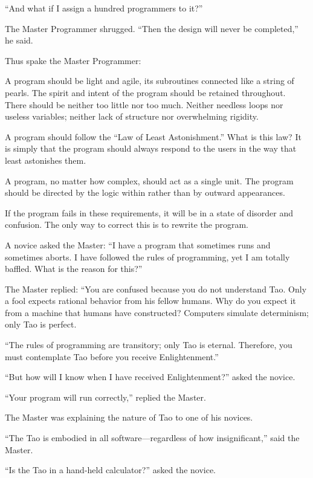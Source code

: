 ``And what if I assign a hundred programmers to it?''

The Master Programmer shrugged. ``Then the design will never be completed,'' he said.

Thus spake the Master Programmer:

A program should be light and agile, its subroutines connected like a string of pearls. The spirit and intent of the program should be retained throughout. There should be neither too little nor too much. Neither needless loops nor useless variables; neither lack of structure nor overwhelming rigidity.

A program should follow the ``Law of Least Astonishment.'' What is this law? It is simply that the program should always respond to the users in the way that least astonishes them.

A program, no matter how complex, should act as a single unit. The program should be directed by the logic within rather than by outward appearances.

If the program fails in these requirements, it will be in a state of disorder and confusion. The only way to correct this is to rewrite the program.

A novice asked the Master: ``I have a program that sometimes runs and sometimes aborts. I have followed the rules of programming, yet I am totally baffled. What is the reason for this?''

The Master replied: ``You are confused because you do not understand Tao. Only a fool expects rational behavior from his fellow humans. Why do you expect it from a machine that humans have constructed? Computers simulate determinism; only Tao is perfect.

``The rules of programming are transitory; only Tao is eternal. Therefore, you must contemplate Tao before you receive Enlightenment.''

``But how will I know when I have received Enlightenment?'' asked the novice.

``Your program will run correctly,'' replied the Master.

The Master was explaining the nature of Tao to one of his novices.

``The Tao is embodied in all software---regardless of how insignificant,'' said the Master.

``Is the Tao in a hand-held calculator?'' asked the novice.


